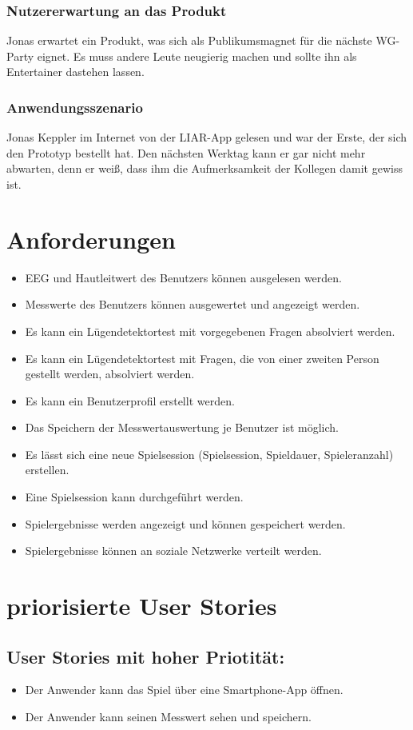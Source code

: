 \documentclass[10pt, a4paper, oneside, titlepage]{scrartcl} %
\begin{document}
	\subsubsection{Nutzererwartung an das Produkt}
	Jonas erwartet ein Produkt, was sich als Publikumsmagnet für die nächste WG-Party eignet. Es muss andere Leute neugierig machen und sollte ihn als Entertainer dastehen lassen. 
	\subsubsection{Anwendungsszenario}
	Jonas Keppler im Internet von der LIAR-App gelesen und war der Erste, der sich den Prototyp bestellt hat. Den nächsten Werktag kann er gar nicht mehr abwarten, denn er weiß, dass ihm die Aufmerksamkeit der Kollegen damit gewiss ist.
	
	\newpage
   	\section{Anforderungen}
	\begin{itemize}
	\item{}EEG und Hautleitwert des Benutzers können ausgelesen werden.
	\item{}Messwerte des Benutzers können ausgewertet und angezeigt werden.
	\item{}Es kann ein Lügendetektortest  mit vorgegebenen Fragen absolviert werden.
	\item{}Es kann ein Lügendetektortest mit Fragen, die von einer zweiten Person gestellt werden, absolviert werden.
	\item{}Es kann ein Benutzerprofil erstellt werden.
	\item{}Das Speichern der Messwertauswertung je Benutzer ist möglich.
	\item{}Es lässt sich eine neue Spielsession (Spielsession, Spieldauer, Spieleranzahl) erstellen.
	\item{}Eine Spielsession kann durchgeführt werden.
	\item{}Spielergebnisse werden angezeigt und können gespeichert werden.
	\item{}Spielergebnisse können an soziale Netzwerke verteilt werden.
	\end{itemize}		
	
	\newpage	
	\section{priorisierte User Stories}	
	\subsection{User Stories mit hoher Priotität:}
	\begin{itemize}
	\item{}Der Anwender kann das Spiel über eine Smartphone-App öffnen.
	\item{}Der Anwender kann seinen Messwert sehen und speichern.
	\end{itemize}
\end{document}
